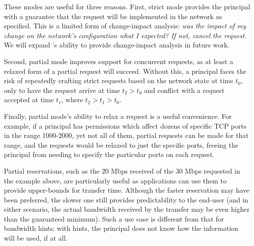 These modes are useful for three reasons. First, strict mode provides
the principal with a guarantee that the request will be implemented
in the network as specified. This is a limited form of change-impact
analysis: \emph{was the impact of my change on the network's configuration
what I expected? If not, cancel the request.} We will expand
\sys's ability to provide change-impact analysis in future work.

Second, partial mode improves support
for concurrent requests, as at least a relaxed form of a partial request will succeed.
Without this, a principal faces the risk of repeatedly crafting
strict requests based on the network state at time $t_0$, only to have
the request arrive at time $t_2 > t_0$ and conflict with a request
accepted at time $t_1$, where $t_2 > t_1 > t_0$.

Finally, partial mode's ability to relax a request is a useful convenience.
For example, if a principal has permissions which affect dozens of
specific TCP ports in the range 1000-2000, yet not all of them, partial
requests can be made for that range, and the requests would be relaxed to
just the specific ports, freeing the principal from needing to specify the
particular ports on each request.

Partial reservations, such as the 20 Mbps received of the 30 Mbps requested
in the example above, are particularly useful as
applications can use them to provide upper-bounds for transfer time. Although the
faster reservation may have been preferred, the slower one still provides
predictability to the end-user (and in either scenario, the actual bandwidth
received by the transfer may be even higher than the guaranteed minimum).
Such a use case is different from that for bandwidth hints; with hints, the
principal does not know how the information will be used, if at all.


